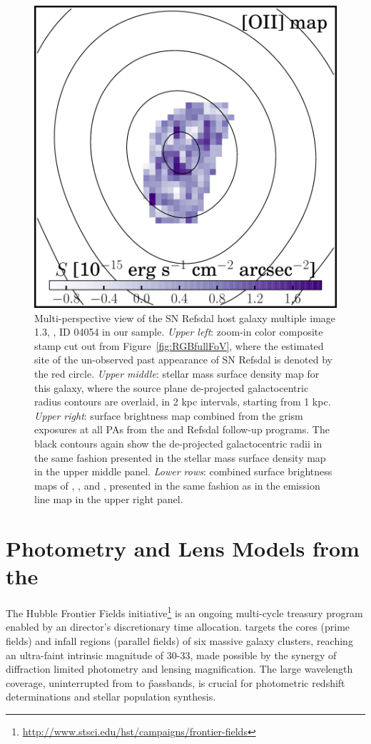 \begin{figure}
	\includegraphics[width=.33\textwidth]{fig_combELmaps/id04054_OII.pdf}
    \caption[Multi-perspective view of the SN Refsdal host galaxy multiple image 1.3, \ie, ID 04504 in our
    sample.]
    {Multi-perspective view of the SN Refsdal host galaxy multiple image 1.3, \ie, ID
    04054 in our \mg sample.  \textit{Upper left}: zoom-in color composite stamp cut out from
    Figure~\ref{fig:RGBfullFoV}, where the estimated site of the un-observed past appearance
    of SN Refsdal is denoted by the red circle. \textit{Upper middle}: stellar mass surface
    density map for this galaxy, where the source plane de-projected galactocentric radius
    contours are overlaid, in 2 kpc intervals, starting from 1 kpc.  \textit{Upper right}:
    \Ha surface brightness map combined from the \hst grism exposures at all PAs from the
    \glass and Refsdal follow-up programs.
    The black contours again show the de-projected galactocentric radii in the same fashion
    presented in the stellar mass surface density map in the upper middle panel.
    \textit{Lower rows}: combined surface brightness maps of \OIII, \Hb, and \OII, presented
    in the same fashion as in the \Ha emission line map in the upper right panel.}
    \label{fig:multiP_4054}
\end{figure}


\section{Photometry and Lens Models from the \hff}\label{sect:phot}

The Hubble Frontier Fields
initiative\footnote{\url{http://www.stsci.edu/hst/campaigns/frontier-fields}} \citep[\hff;
P.I.  Lotz,][]{Lotz:2016ca} is an ongoing multi-cycle treasury program enabled by an \hst
director's discretionary time allocation. \hff targets the cores (prime fields) and infall regions (parallel fields)
of six massive galaxy clusters, reaching an ultra-faint intrinsic magnitude of 30-33, made possible by the synergy of diffraction
limited photometry and lensing magnification. The large wavelength coverage, uninterrupted from \B to \H passbands, is crucial for
photometric redshift determinations and stellar population synthesis.


